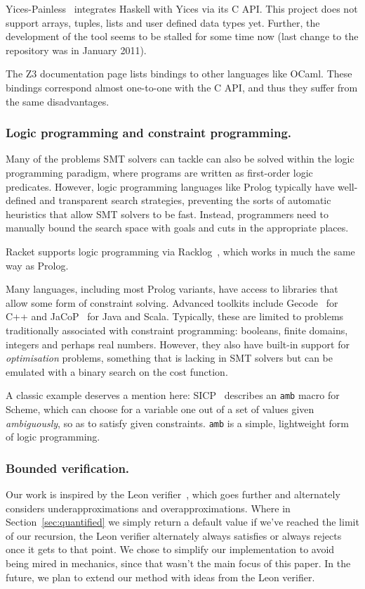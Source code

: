 Yices-Painless~\cite{yices-painless} integrates Haskell with Yices via its C
API. This project does not support arrays, tuples, lists and user defined data
types yet. Further, the development of the tool seems to be stalled for some
time now (last change to the repository was in January 2011).

The Z3 documentation page lists bindings to other languages like OCaml. These
bindings correspond almost one-to-one with the C API, and thus they suffer
from the same disadvantages.

\subsubsection{Logic programming and constraint programming.}

Many of the problems SMT solvers can tackle can also be solved within the
logic programming paradigm, where programs are written as first-order logic
predicates. However, logic programming languages like Prolog typically have
well-defined and transparent search strategies, preventing the sorts of
automatic heuristics that allow SMT solvers to be fast. Instead, programmers
need to manually bound the search space with goals and cuts in the appropriate
places.

Racket supports logic programming via Racklog~\cite{racklog}, which works in
much the same way as Prolog.

Many languages, including most Prolog variants, have access to libraries that
allow some form of constraint solving. Advanced toolkits include
Gecode~\cite{gecode} for C++ and JaCoP~\cite{JaCoP} for Java and Scala.
Typically, these are limited to problems traditionally associated with
constraint programming: booleans, finite domains, integers and perhaps real
numbers. However, they also have built-in support for \textit{optimisation}
problems, something that is lacking in SMT solvers but can be emulated with a
binary search on the cost function.

A classic example deserves a mention here: SICP~\cite[Section~4.3]{sicp}
describes an \texttt{amb} macro for Scheme, which can choose for a variable
one out of a set of values given \textit{ambiguously}, so as to satisfy given
constraints. \texttt{amb} is a simple, lightweight form of logic programming.

\subsubsection{Bounded verification.}

Our work is inspired by the Leon verifier~\cite{sat-recursive}, which goes
further and alternately considers underapproximations and overapproximations.
Where in Section~\ref{sec:quantified} we simply return a default value if
we've reached the limit of our recursion, the Leon verifier alternately always
satisfies or always rejects once it gets to that point. We chose to simplify
our implementation to avoid being mired in mechanics, since that wasn't the
main focus of this paper. In the future, we plan to extend our method with
ideas from the Leon verifier.

